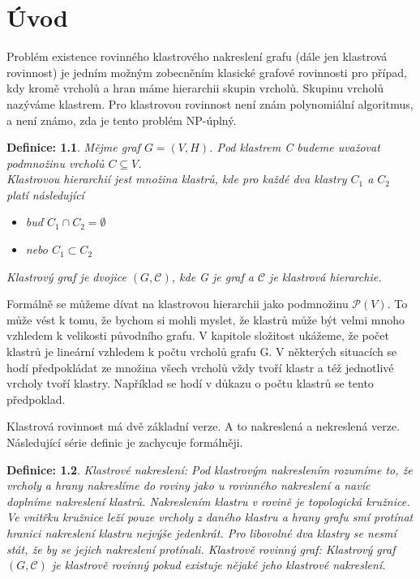 \documentclass[12pt,a4report]{report}
\newtheorem{defn}{Definice: }[chapter]
\begin{document}
\author{Filip Šedivý}

\chapter{Úvod}
Problém existence rovinného klastrového nakreslení grafu (dále jen klastrová rovinnost) je jedním možným zobecněním klasické grafové rovinnosti pro případ, kdy kromě vrcholů a hran máme hierarchii skupin vrcholů. Skupinu vrcholů nazýváme klastrem. Pro klastrovou rovinnost není znám polynomiální algoritmus, a není známo, zda je tento problém NP-úplný. 

\begin{defn}
Mějme graf $G=(V,H)$. Pod klastrem C budeme uvažovat podmnožinu vrcholů  $C \subseteq V$. \\
Klastrovou hierarchií jest množina klastrů, kde pro každé dva klastry $C_1$ a $C_2$ platí následující
\begin{itemize}
\item buď $C_1 \cap C_2 = \emptyset$
\item nebo $C_1 \subset C_2$
\end{itemize}
Klastrový graf je dvojice $(G,\mathcal C)$, kde G je graf a $\mathcal C$ je klastrová hierarchie.
\end{defn}

Formálně se můžeme dívat na klastrovou hierarchii jako podmnožinu $\mathcal P (V)$. To může vést k tomu, že bychom si mohli myslet, že klastrů může být velmi mnoho vzhledem k velikosti původního grafu. V kapitole složitost ukážeme, že počet klastrů je lineární vzhledem k počtu vrcholů grafu G. V některých situacích se hodí předpokládat ze množina všech vrcholů vždy tvoří klastr a též jednotlivé vrcholy tvoří klastry. Například se hodí v důkazu o počtu klastrů se tento předpoklad.

Klastrová rovinnost má dvě základní verze. A to nakreslená a nekreslená verze. Následující série definic je zachycuje formálněji.
\begin{defn}
Klastrové nakreslení: Pod klastrovým nakreslením rozumíme to, že vrcholy a hrany nakreslíme do roviny jako u rovinného nakreslení a navíc doplníme nakreslení klastrů. Nakreslením klastru v rovině je topologická kružnice. Ve vnitřku kružnice leží pouze vrcholy z daného klastru a hrany grafu smí protínat hranici nakreslení klastru nejvýše jedenkrát. Pro libovolné dva klastry se nesmí stát, že by se jejich nakreslení protínali.
Klastrově rovinný graf: Klastrový graf $(G,\mathcal C)$ je klastrově rovinný pokud existuje nějaké jeho klastrové nakreslení.
\end{defn}
\end{document}
